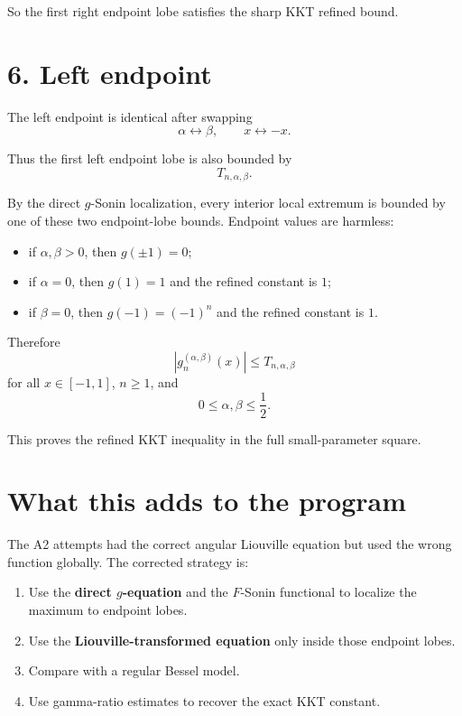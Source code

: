 \documentclass[11pt]{article}
\begin{document}
So the first right endpoint lobe satisfies the sharp KKT refined bound.

\section*{6. Left endpoint}

The left endpoint is identical after swapping
\begin{equation*}
\alpha\leftrightarrow\beta,
\qquad
x\leftrightarrow -x.
\end{equation*}

Thus the first left endpoint lobe is also bounded by
\begin{equation*}
T_{n,\alpha,\beta}.
\end{equation*}

By the direct \(g\)-Sonin localization, every interior local extremum is bounded by one of these two endpoint-lobe bounds. Endpoint values are harmless:

\begin{itemize}
\item if \(\alpha,\beta>0\), then \(g(\pm1)=0\);
\item if \(\alpha=0\), then \(g(1)=1\) and the refined constant is \(1\);
\item if \(\beta=0\), then \(g(-1)=(-1)^n\) and the refined constant is \(1\).
\end{itemize}

Therefore
\begin{equation*}
\boxed{
|g_n^{(\alpha,\beta)}(x)|
\le
T_{n,\alpha,\beta}
}
\end{equation*}
for all \(x\in[-1,1]\), \(n\ge1\), and
\begin{equation*}
0\le\alpha,\beta\le\frac12.
\end{equation*}

This proves the refined KKT inequality in the full small-parameter square.

\section*{What this adds to the program}

The A2 attempts had the correct angular Liouville equation but used the wrong function globally. The corrected strategy is:

\begin{enumerate}
\item Use the \textbf{direct \(g\)-equation} and the \(F\)-Sonin functional to localize the maximum to endpoint lobes.
\item Use the \textbf{Liouville-transformed equation} only inside those endpoint lobes.
\item Compare with a regular Bessel model.
\item Use gamma-ratio estimates to recover the exact KKT constant.
\end{enumerate}
\end{document}

